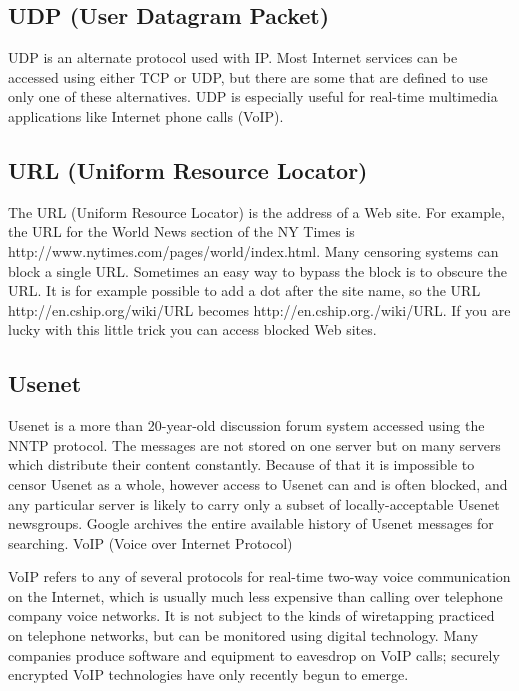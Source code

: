 \subsection{UDP (User Datagram Packet)}

UDP is an alternate protocol used with IP. Most Internet services can be
accessed using either TCP or UDP, but there are some that are defined to
use only one of these alternatives. UDP is especially useful for
real-time multimedia applications like Internet phone calls (VoIP).

\subsection{URL (Uniform Resource Locator)}

The URL (Uniform Resource Locator) is the address of a Web site. For
example, the URL for the World News section of the NY Times is
http://www.nytimes.com/pages/world/index.html. Many censoring systems
can block a single URL. Sometimes an easy way to bypass the block is to
obscure the URL. It is for example possible to add a dot after the site
name, so the URL http://en.cship.org/wiki/URL becomes
http://en.cship.org./wiki/URL. If you are lucky with this little trick
you can access blocked Web sites.

\subsection{Usenet}

Usenet is a more than 20-year-old discussion forum system accessed using
the NNTP protocol. The messages are not stored on one server but on many
servers which distribute their content constantly. Because of that it is
impossible to censor Usenet as a whole, however access to Usenet can and
is often blocked, and any particular server is likely to carry only a
subset of locally-acceptable Usenet newsgroups. Google archives the
entire available history of Usenet messages for searching. VoIP (Voice
over Internet Protocol)

VoIP refers to any of several protocols for real-time two-way voice
communication on the Internet, which is usually much less expensive than
calling over telephone company voice networks. It is not subject to the
kinds of wiretapping practiced on telephone networks, but can be
monitored using digital technology. Many companies produce software and
equipment to eavesdrop on VoIP calls; securely encrypted VoIP
technologies have only recently begun to emerge.

